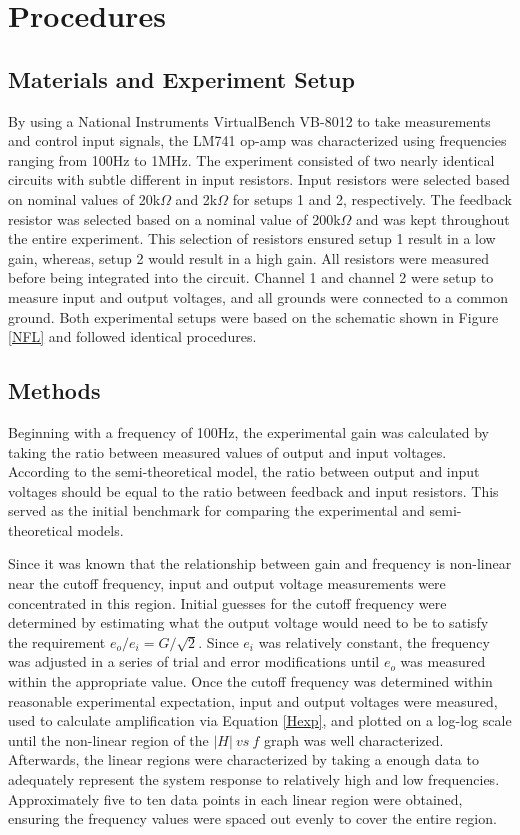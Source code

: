 \documentclass[letterpaper,12pt]{article}
\begin{document}
\section{Procedures}
\subsection{Materials and Experiment Setup}
By using a National Instruments VirtualBench VB-8012 to take measurements and control input signals, the LM741 op-amp was characterized using frequencies ranging from 100Hz to 1MHz. The experiment consisted of two nearly identical circuits with subtle different in input resistors. Input resistors were selected based on nominal values of 20k$\Omega$ and 2k$\Omega$ for setups 1 and 2, respectively. The feedback resistor was selected based on a nominal value of 200k$\Omega$ and was kept throughout the entire experiment. This selection of resistors ensured setup 1 result in a low gain, whereas, setup 2 would result in a high gain. All resistors were measured before being integrated into the circuit. Channel 1 and channel 2 were setup to measure input and output voltages, and all grounds were connected to a common ground. Both experimental setups were based on the schematic shown in Figure \ref{NFL} and followed identical procedures. 

\subsection{Methods}
Beginning with a frequency of 100Hz, the experimental gain was calculated by taking the ratio between measured values of output and input voltages. According to the semi-theoretical model, the ratio between output and input voltages should be equal to the ratio between feedback and input resistors. This served as the initial benchmark for comparing the experimental and semi-theoretical models.

Since it was known that the relationship between gain and frequency is non-linear near the cutoff frequency, input and output voltage measurements were concentrated in this region. Initial guesses for the cutoff frequency were determined by estimating what the output voltage would need to be to satisfy the requirement $e_o/e_i = G/\sqrt{2}$. Since $e_i$ was relatively constant, the frequency was adjusted in a series of trial and error modifications until $e_o$ was measured within the appropriate value. Once the cutoff frequency was determined within reasonable experimental expectation, input and output voltages were measured, used to calculate amplification via Equation \ref{Hexp}, and plotted on a log-log scale until the non-linear region of the $|H|\ vs\ f$ graph was well characterized. Afterwards, the linear regions were characterized by taking a enough data to adequately represent the system response to relatively high and low frequencies. Approximately five to ten data points in each linear region were obtained, ensuring the frequency values were spaced out evenly to cover the entire region.
\end{document}

